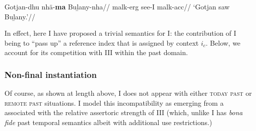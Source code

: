 \pex\begingl\gla Gotjan-dhu nhä-\textbf{ma} Buḻany-nha//
\glb \gls{malk}-\gls{erg} see-\gls{I} \gls{malk}-\gls{acc}//
\glft`Gotjan saw Buḻany.'//\endgl

\xe

\noindent In effect, here I have proposed a trivial semantics for \gls{I}: the contribution of \gls{I} being to ``pass up'' a reference index that is assigned by context $ i_c $. Below, we account for its competition with \gls{III} within the past domain.
\subsubsection{Non-final instantiation}

Of course, as shown at length above, \gls{I} does not appear with either \textsc{today past} or \textsc{remote past} situations. I model this incompatibility as emerging from a  associated with the relative assertoric strength of \gls{III} (which, unlike \gls{I} has \textit{bona fide} past temporal semantics albeit with additional use restrictions.)



